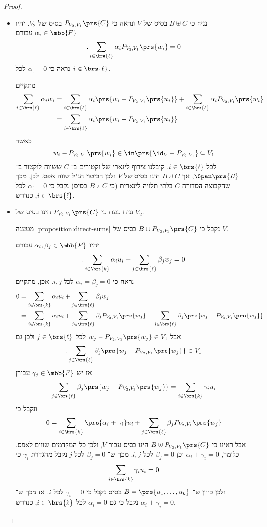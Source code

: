 \documentclass[a4paper,10pt,twoside,openany]{article}
\begin{document}
\begin{proof}
\begin{itemize}
\item נניח כי
$B \uplus C$
בסיס  של
$V$
ונראה כי
$P_{V_2, V_1}\prs{C}$
בסיס של
$V_2$.
יהיו
$\alpha_i \in \mbb{F}$
עבורם
\[\text{.} \sum_{i \in \brs{\ell}} \alpha_i P_{V_2, V_1}\prs{w_i} = 0\]
נראה כי
$\alpha_i = 0$
לכל
$i \in \brs{\ell}$.

מתקיים
\begin{align*}
\sum_{i \in \brs{\ell}} \alpha_i w_i
&=
\sum_{i \in \brs{\ell}} \alpha_i \prs{w_i - P_{V_2, V_1}\prs{w_i}} + \sum_{i \in \brs{\ell}} \alpha_i P_{V_2, V_1}\prs{w_i}
\\&=
\sum_{i \in \brs{\ell}} \alpha_i \prs{w_i - P_{V_2, V_1}\prs{w_i}}
\end{align*}
כאשר
\[w_i - P_{V_2, V_1}\prs{w_i} \in \im\prs{\id_V - P_{V_2, V_1}} \subseteq V_1\]
לכל
$i \in \brs{\ell}$.
קיבלנו צירוף לינארי של וקטורים ב־%
$C$
ששווה לוקטור ב־%
$\Span\prs{B}$,
אך
$B \uplus C$
הינו בסיס של
$V$
ולכן הביטוי הנ"ל שווה אפס.
לכן, מכך שהקבוצה הסדורה
$C$
בלתי תלויה לינארית (כי $B \uplus C$ בסיס) נקבל כי
$\alpha_i = 0$
לכל
$i \in \brs{\ell}$,
כנדרש.

\item נניח כעת כי
$P_{V_2, V_1}\prs{C}$
הינו בסיס של
$V_2$.

מטענה
\ref{proposition:direct-sums}
נקבל כי
$B \uplus P_{V_2, V_1}\prs{C}$
בסיס של
$V$.

יהיו
$\alpha_i, \beta_j \in \mbb{F}$
עבורם
\[\text{.} \sum_{i \in \brs{k}} \alpha_i u_i + \sum_{j \in \brs{\ell}} \beta_j w_j = 0\]
נראה כי
$\alpha_i = \beta_j = 0$
לכל
$i,j$.
אכן, מתקיים
\begin{align*}
0 &= \sum_{i \in \brs{k}} \alpha_i u_i + \sum_{j \in \brs{\ell}} \beta_j w_j
\\&=
\sum_{i \in \brs{k}} \alpha_i u_i + \sum_{j \in \brs{\ell}} \beta_j P_{V_2, V_1}\prs{w_j} + \sum_{j \in \brs{\ell}} \beta_j \prs{w_j - P_{V_2, V_1}\prs{w_j}}
\end{align*}
אבל
$w_j - P_{V_2, V_1}\prs{w_j} \in V_1$
לכל
$j \in \brs{\ell}$
ולכן גם
\[\text{.} \sum_{j \in \brs{\ell}} \beta_j \prs{w_j - P_{V_2, V_1}\prs{w_j}} \in V_1\]
אז יש
$\gamma_j \in \mbb{F}$
עבורן
\[\sum_{j \in \brs{\ell}} \beta_j \prs{w_j - P_{V_2, V_1}\prs{w_j}} = \sum_{i \in \brs{k}} \gamma_i u_i\]
ונקבל כי
\[0 = \sum_{i \in \brs{k}} \prs{\alpha_i + \gamma_i} u_i + \sum_{j \in \brs{\ell}} \beta_j P_{V_2, V_1}\prs{w_j}\]
אבל ראינו כי
$B \uplus P_{V_2, V_1}\prs{C}$
הינו בסיס עבור
$V$,
ולכן כל המקדמים שווים לאפס. כלומר,
$\alpha_i + \gamma_i = 0$
וכן
$\beta_j = 0$
לכל
$i,j$.
מכך ש־%
$\beta_j = 0$
לכל
$j$
נקבל מהגדרת
$\gamma_i$
כי
\[\sum_{i \in \brs{k}} \gamma_i u_i = 0\]
ולכן כיוון ש־%
$B = \prs{u_1, \ldots, u_k}$
בסיס נקבל כי
$\gamma_i = 0$
לכל
$i$.
אז מכך ש־%
$\alpha_i + \gamma_i = 0$
נקבל כי גם
$\alpha_i = 0$
לכל
$i \in \brs{k}$,
כנדרש.
\end{itemize}
\end{proof}
\end{document}
